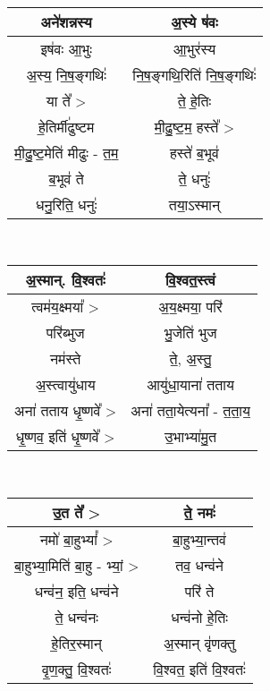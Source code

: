 {\centering
{\small {}} \\
\begin{longtable}{|c|c|}
\hline
अने॑शन्नस्य                  & अ॒स्ये ष॑वः\\
\hline
इष॑वः आ॒भुः                 & आ॒भुर॑स्य\\
\hline
अ॒स्य॒ नि॒ष॒ङ्गथिः॑             & नि॒ष॒ङ्गथि॒रिति॑ नि॒ष॒ङ्गथिः॑\\
\hline
या ते᳚ >                   & ते॒ हे॒तिः\\
\hline
हे॒तिर्मी॑ढुष्टम               & मी॒ढु॒ष्ट॒म॒ हस्ते᳚ >\\
\hline
मी॒ढु॒ष्ट॒मेति॑ मीढुः - त॒म॒       & हस्ते॑ ब॒भूव॑\\
\hline
ब॒भूव॑ ते                    & ते॒ धनुः॑\\
\hline
धनु॒रिति॒ धनुः॑               & तया॒ऽस्मान्\\
\hline
\end{longtable}
}
{\centering
{\small {}} \\
\begin{longtable}{|c|c|}
\hline
अ॒स्मान्. वि॒श्वतः॑            & वि॒श्वत॒स्त्वं\\
\hline
त्वम॑य॒क्ष्मया᳚ >              & अ॒य॒क्ष्मया॒ परि॑\\
\hline
परि॑ब्भुज                   & भु॒जेति॑ भुज\\
\hline
नम॑स्ते                     & ते॒, अ॒स्तु॒\\
\hline
अ॒स्त्वायु॑धाय                & आयु॑धा॒याना॑ तताय\\
\hline
अना॑ तताय धृ॒ष्णवे᳚ >           & अना॑ तता॒येत्यना᳚ - त॒ता॒य॒\\
\hline
धृ॒ष्णव॒ इति॑ धृ॒ष्णवे᳚ >          & उ॒भाभ्या॑मु॒त\\
\hline
\end{longtable}
}
{\centering
{\small {}} \\
\begin{longtable}{|c|c|}
\hline
उ॒त ते᳚ >                   & ते॒ नमः॑\\
\hline
नमो॑ बा॒हुभ्यां᳚ >             & बा॒हुभ्या॒न्तव॑\\
\hline
बा॒हुभ्या॒मिति॑ बा॒हु - भ्यां॒ >   & तव॒ धन्व॑ने\\
\hline
धन्व॑न॒ इति॒ धन्व॑ने            & परि॑ ते\\
\hline
ते॒ धन्व॑नः                  & धन्व॑नो हे॒तिः\\
\hline
हे॒तिर॒स्मान्                 & अ॒स्मान् वृ॑णक्तु\\
\hline
वृ॒ण॒क्तु॒ वि॒श्वतः॑              & वि॒श्वत॒ इति॑ वि॒श्वतः॑\\
\hline
\end{longtable}
}
